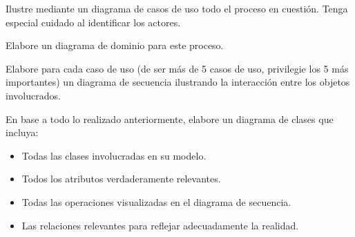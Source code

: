 \documentclass[11pt]{article}
\begin{document}
\begin{spacing}{1.2}
\begin{Problem}
\begin{ProbPart}[difficulty={40}]
Ilustre mediante un diagrama de casos de uso todo el proceso en cuestión. Tenga especial
cuidado al identificar los actores.

\end{ProbPart}

\begin{ProbPart}[difficulty={40}]

Elabore un diagrama de dominio para este proceso.

\end{ProbPart}

\begin{ProbPart}[difficulty={40}]

Elabore para cada caso de uso (de ser más de 5 casos de uso, privilegie los 5 más importantes)
un diagrama de secuencia ilustrando la interacción entre los objetos involucrados.

\end{ProbPart}

\begin{ProbPart}[difficulty={40}]

En base a todo lo realizado anteriormente, elabore un diagrama de clases que incluya:

\begin{itemize}[topsep=0pt]
    \item Todas las clases involucradas en su modelo.
    \item Todos los atributos verdaderamente relevantes.
    \item Todas las operaciones visualizadas en el diagrama de secuencia.
    \item Las relaciones relevantes para reflejar adecuadamente la realidad.
\end{itemize}

\end{ProbPart}
\end{Problem}

\begin{NewAnswer}
\end{NewAnswer}

\end{spacing}
\end{document}

